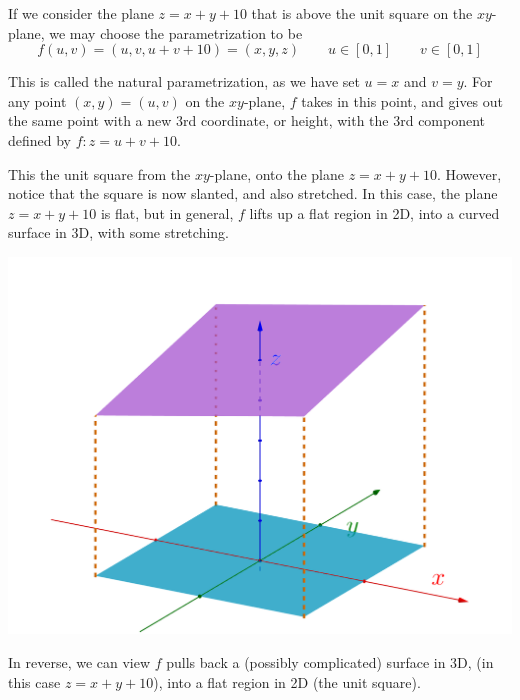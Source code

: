 \begin{example}
    If we consider the plane $z = x + y + 10$ that is above the unit square on the $xy$-plane, we may choose the parametrization to be $$f(u, v) = (u, v, u + v + 10) = (x, y, z) \qquad u \in [0, 1] \qquad v \in [0, 1]$$

    This is called the natural parametrization, as we have set $u = x$ and $v = y$. For any point $(x, y) = (u, v)$ on the $xy$-plane, $f$ takes in this point, and gives out the same point with a new 3rd coordinate, or height, with the 3rd component defined by $f: z = u + v + 10$.

    This  the unit square from the $xy$-plane, onto the plane $z = x + y + 10$. However, notice that the square is now slanted, and also stretched. In this case, the plane $z = x + y + 10$ is flat, but in general, $f$ lifts up a flat region in 2D, into a curved surface in 3D, with some stretching.
    
    \begin{minipage}{0.45\linewidth}
        \begin{center}
        \end{center}
    \end{minipage}
    \begin{minipage}{0.45\linewidth}
        \begin{center} \includegraphics[width=0.95\linewidth]{Plots/s_5_2/u_v_uv10.png} \end{center}
    \end{minipage}

    In reverse, we can view $f$ pulls back a (possibly complicated) surface in 3D, (in this case $z = x + y + 10$), into a flat region in 2D (the unit square).
\end{example}

